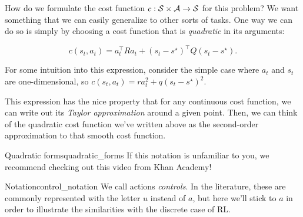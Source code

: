 \documentclass[../main/main]{subfiles}
\begin{document}
How do we formulate the cost function $c : \mathcal{S} \times \mathcal{A} \to \mathcal{S}$ for this problem? We want something that we can easily generalize to other sorts of tasks. One way we can do so is simply by choosing a cost function that is \emph{quadratic} in its arguments:

\begin{equation}
    c(s_t, a_t) = a_t^\top R a_t + (s_t  - s^\star)^\top Q (s_t - s^\star).
\end{equation}

For some intuition into this expression, consider the simple case where $a_t$ and $s_t$ are one-dimensional, so $c(s_t, a_t) = r a_t^2 + q (s_t - s^\star)^2$.

This expression has the nice property that for any continuous cost function, we
can write out its \emph{Taylor approximation} around a given point. Then, we can
think of the quadratic cost function we've written above as the second-order
approximation to that smooth cost function.


\begin{remark}{Quadratic forms}{quadratic_forms}
    If this notation is unfamiliar to you, we recommend checking out this video
    from Khan Academy! %
\end{remark}


\begin{remark}{Notation}{control_notation}
    We call actions \emph{controls}. In the literature, these are commonly
    represented with the letter $u$ instead of $a$, but here we'll stick to $a$
    in order to illustrate the similarities with the discrete case of RL.
\end{remark}
\end{document}
